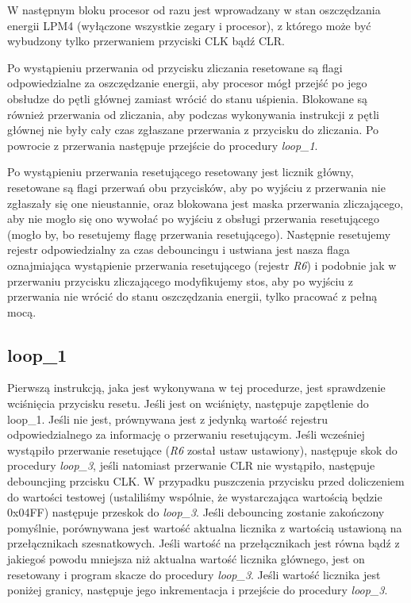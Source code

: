 \documentclass[fleqn]{article}
\begin{document}
		W następnym bloku procesor od razu jest wprowadzany w stan oszczędzania energii LPM4 (wyłączone wszystkie zegary i procesor), z którego może być wybudzony tylko przerwaniem przyciski CLK bądź CLR.

		Po wystąpieniu przerwania od przycisku zliczania resetowane są flagi odpowiedzialne za oszczędzanie energii, aby procesor mógł przejść po jego obsłudze do pętli głównej zamiast wrócić do stanu uśpienia. Blokowane są również przerwania od zliczania, aby podczas wykonywania instrukcji z pętli głównej nie były cały czas zgłaszane przerwania z przycisku do zliczania. Po powrocie z przerwania następuje przejście do procedury \textit{loop\_1}.

		Po wystąpieniu przerwania resetującego resetowany jest licznik główny, resetowane są flagi przerwań obu przycisków, aby po wyjściu z przerwania nie zgłaszały się one nieustannie, oraz blokowana jest maska przerwania zliczającego, aby nie mogło się ono wywołać po wyjściu z obsługi przerwania resetującego (mogło by, bo resetujemy flagę przerwania resetującego). Następnie resetujemy rejestr odpowiedzialny za czas debouncingu i ustwiana jest nasza flaga oznajmiająca wystąpienie przerwania resetującego (rejestr \textit{R6}) i podobnie jak w przerwaniu przycisku zliczającego modyfikujemy stos, aby po wyjściu z przerwania nie wrócić do stanu oszczędzania energii, tylko pracować z pełną mocą.

\subsection{loop\_1}
		Pierwszą instrukcją, jaka jest wykonywana w tej procedurze, jest sprawdzenie wciśnięcia przycisku resetu. Jeśli jest on wciśnięty, następuje zapętlenie do loop\_1. Jeśli nie jest, prównywana jest z jedynką wartość rejestru odpowiedzialnego za informację o przerwaniu resetującym. Jeśli wcześniej wystąpiło przerwanie resetujące (\textit{R6} został ustaw ustawiony), następuje skok do procedury \textit{loop\_3}, jeśli natomiast przerwanie CLR nie wystąpiło, następuje debouncjing przcisku CLK. W przypadku puszczenia przycisku przed doliczeniem do wartości testowej (ustaliliśmy wspólnie, że wystarczająca wartością będzie 0x04FF) następuje przeskok do \textit{loop\_3}. Jeśli debouncing zostanie zakończony pomyślnie, porównywana jest wartość aktualna licznika z wartością ustawioną na przełącznikach szesnatkowych. Jeśli wartość na przełącznikach jest równa bądź z jakiegoś powodu mniejsza niż aktualna wartość licznika głównego, jest on resetowany i program skacze do procedury \textit{loop\_3}. Jeśli wartość licznika jest poniżej granicy, następuje jego inkrementacja i przejście do procedury \textit{loop\_3}.
\end{document}
